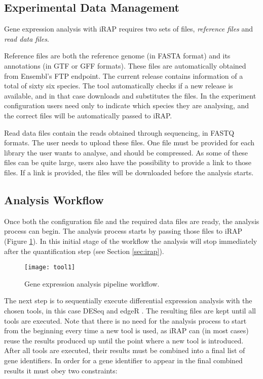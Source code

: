\subsection{Experimental Data Management}

Gene expression analysis with iRAP requires two sets of files, \emph{reference
files} and \emph{read data files}.

Reference files are both the reference genome (in FASTA format) and its
annotations (in GTF or GFF formats). These files are automatically obtained from
Ensembl's FTP endpoint. The current release contains information of a total of
sixty six species. The tool automatically checks if a new release is available,
and in that case downloads and substitutes the files. In the experiment
configuration users need only to indicate which species they are analysing, and
the correct files will be automatically passed to iRAP.

Read data files contain the reads obtained through sequencing, in FASTQ formats.
The user needs to upload these files. One file must be provided for each library
the user wants to analyse, and should be compressed. As some of these files can
be quite large, users also have the possibility to provide a link to those
files. If a link is provided, the files will be downloaded before the analysis
starts.

\subsection{Analysis Workflow}\label{sec:descworkflow}

Once both the configuration file and the required data files are ready, the
analysis process can begin. The analysis process starts by passing those files
to iRAP (Figure \ref{fig:tool1}). In this initial stage of the workflow the
analysis will stop immediately after the quantification step (see Section
\ref{sec:irap}).

\begin{figure}[!htb]
  \begin{center}
    \leavevmode
    \texttt{[image: tool1]}
    \caption[Gene expression analysis pipeline workflow]{
      Gene expression analysis pipeline workflow.
    }
    \label{fig:tool1}
  \end{center}
\end{figure}

The next step is to sequentially execute differential expression analysis with
the chosen tools, in this case DESeq \cite{20979621} and edgeR
\cite{robinson2010edger}. The resulting files are kept until all tools are
executed. Note that there is no need for the analysis process to start from the
beginning every time a new tool is used, as iRAP can (in most cases) reuse the
results produced up until the point where a new tool is introduced. After all
tools are executed, their results must be combined into a final list of gene
identifiers. In order for a gene identifier to appear in the final combined
results it must obey two constraints:

